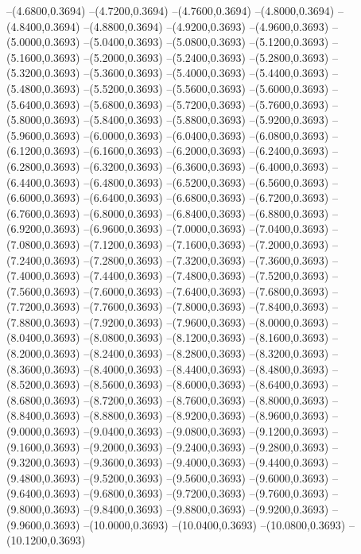 {	--(4.6800,0.3694)
	--(4.7200,0.3694)
	--(4.7600,0.3694)
	--(4.8000,0.3694)
	--(4.8400,0.3694)
	--(4.8800,0.3694)
	--(4.9200,0.3693)
	--(4.9600,0.3693)
	--(5.0000,0.3693)
	--(5.0400,0.3693)
	--(5.0800,0.3693)
	--(5.1200,0.3693)
	--(5.1600,0.3693)
	--(5.2000,0.3693)
	--(5.2400,0.3693)
	--(5.2800,0.3693)
	--(5.3200,0.3693)
	--(5.3600,0.3693)
	--(5.4000,0.3693)
	--(5.4400,0.3693)
	--(5.4800,0.3693)
	--(5.5200,0.3693)
	--(5.5600,0.3693)
	--(5.6000,0.3693)
	--(5.6400,0.3693)
	--(5.6800,0.3693)
	--(5.7200,0.3693)
	--(5.7600,0.3693)
	--(5.8000,0.3693)
	--(5.8400,0.3693)
	--(5.8800,0.3693)
	--(5.9200,0.3693)
	--(5.9600,0.3693)
	--(6.0000,0.3693)
	--(6.0400,0.3693)
	--(6.0800,0.3693)
	--(6.1200,0.3693)
	--(6.1600,0.3693)
	--(6.2000,0.3693)
	--(6.2400,0.3693)
	--(6.2800,0.3693)
	--(6.3200,0.3693)
	--(6.3600,0.3693)
	--(6.4000,0.3693)
	--(6.4400,0.3693)
	--(6.4800,0.3693)
	--(6.5200,0.3693)
	--(6.5600,0.3693)
	--(6.6000,0.3693)
	--(6.6400,0.3693)
	--(6.6800,0.3693)
	--(6.7200,0.3693)
	--(6.7600,0.3693)
	--(6.8000,0.3693)
	--(6.8400,0.3693)
	--(6.8800,0.3693)
	--(6.9200,0.3693)
	--(6.9600,0.3693)
	--(7.0000,0.3693)
	--(7.0400,0.3693)
	--(7.0800,0.3693)
	--(7.1200,0.3693)
	--(7.1600,0.3693)
	--(7.2000,0.3693)
	--(7.2400,0.3693)
	--(7.2800,0.3693)
	--(7.3200,0.3693)
	--(7.3600,0.3693)
	--(7.4000,0.3693)
	--(7.4400,0.3693)
	--(7.4800,0.3693)
	--(7.5200,0.3693)
	--(7.5600,0.3693)
	--(7.6000,0.3693)
	--(7.6400,0.3693)
	--(7.6800,0.3693)
	--(7.7200,0.3693)
	--(7.7600,0.3693)
	--(7.8000,0.3693)
	--(7.8400,0.3693)
	--(7.8800,0.3693)
	--(7.9200,0.3693)
	--(7.9600,0.3693)
	--(8.0000,0.3693)
	--(8.0400,0.3693)
	--(8.0800,0.3693)
	--(8.1200,0.3693)
	--(8.1600,0.3693)
	--(8.2000,0.3693)
	--(8.2400,0.3693)
	--(8.2800,0.3693)
	--(8.3200,0.3693)
	--(8.3600,0.3693)
	--(8.4000,0.3693)
	--(8.4400,0.3693)
	--(8.4800,0.3693)
	--(8.5200,0.3693)
	--(8.5600,0.3693)
	--(8.6000,0.3693)
	--(8.6400,0.3693)
	--(8.6800,0.3693)
	--(8.7200,0.3693)
	--(8.7600,0.3693)
	--(8.8000,0.3693)
	--(8.8400,0.3693)
	--(8.8800,0.3693)
	--(8.9200,0.3693)
	--(8.9600,0.3693)
	--(9.0000,0.3693)
	--(9.0400,0.3693)
	--(9.0800,0.3693)
	--(9.1200,0.3693)
	--(9.1600,0.3693)
	--(9.2000,0.3693)
	--(9.2400,0.3693)
	--(9.2800,0.3693)
	--(9.3200,0.3693)
	--(9.3600,0.3693)
	--(9.4000,0.3693)
	--(9.4400,0.3693)
	--(9.4800,0.3693)
	--(9.5200,0.3693)
	--(9.5600,0.3693)
	--(9.6000,0.3693)
	--(9.6400,0.3693)
	--(9.6800,0.3693)
	--(9.7200,0.3693)
	--(9.7600,0.3693)
	--(9.8000,0.3693)
	--(9.8400,0.3693)
	--(9.8800,0.3693)
	--(9.9200,0.3693)
	--(9.9600,0.3693)
	--(10.0000,0.3693)
	--(10.0400,0.3693)
	--(10.0800,0.3693)
	--(10.1200,0.3693)
}
